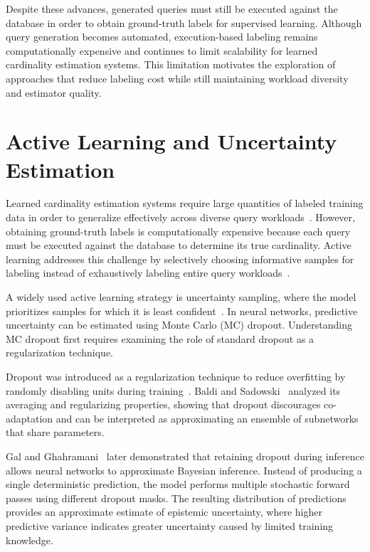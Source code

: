 Despite these advances, generated queries must still be executed against the database in order to obtain ground-truth labels for supervised learning. Although query generation becomes automated, execution-based labeling remains computationally expensive and continues to limit scalability for learned cardinality estimation systems. This limitation motivates the exploration of approaches that reduce labeling cost while still maintaining workload diversity and estimator quality.

\section{Active Learning and Uncertainty Estimation}

Learned cardinality estimation systems require large quantities of labeled training data in order to generalize effectively across diverse query workloads~\cite{DBLP:conf/cidr/KipfKRLBK19,DBLP:journals/pvldb/WangQWWZ21}. However, obtaining ground-truth labels is computationally expensive because each query must be executed against the database to determine its true cardinality\cite{DBLP:phd/dnb/Woltmann23}. Active learning addresses this challenge by selectively choosing informative samples for labeling instead of exhaustively labeling entire query workloads~\cite{DBLP:journals/tnn/LiWCJDO25}.

A widely used active learning strategy is uncertainty sampling, where the model prioritizes samples for which it is least confident~\cite{DBLP:journals/tnn/LiWCJDO25}. In neural networks, predictive uncertainty can be estimated using Monte Carlo (MC) dropout. Understanding MC dropout first requires examining the role of standard dropout as a regularization technique\cite{DBLP:conf/cvpr/ZeeviSLSO25}.

Dropout was introduced as a regularization technique to reduce overfitting by randomly disabling units during training~\cite{srivastava2014dropout}. Baldi and Sadowski~\cite{DBLP:conf/nips/BaldiS13} analyzed its averaging and regularizing properties, showing that dropout discourages co-adaptation and can be interpreted as approximating an ensemble of subnetworks that share parameters.
 
Gal and Ghahramani~\cite{DBLP:conf/icml/GalG16} later demonstrated that retaining dropout during inference allows neural networks to approximate Bayesian inference. Instead of producing a single deterministic prediction, the model performs multiple stochastic forward passes using different dropout masks. The resulting distribution of predictions provides an approximate estimate of epistemic uncertainty, where higher predictive variance indicates greater uncertainty caused by limited training knowledge.

